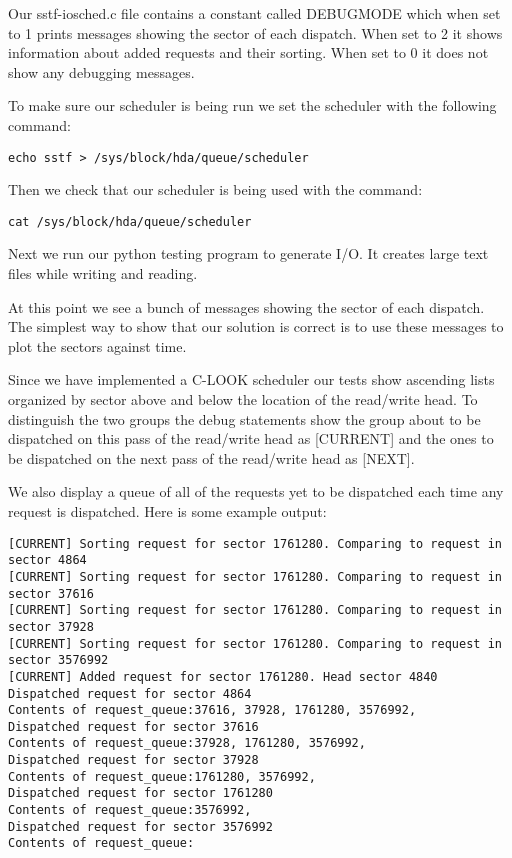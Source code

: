\documentclass[journal,10pt,onecolumn,letterpaper,draftclsnofoot]{IEEEtran}
\begin{document}
Our sstf-iosched.c file contains a constant called DEBUG\textunderscore MODE which when set to 1 prints messages showing the sector of each dispatch. When set to 2 it shows information about added requests and their sorting. When set to 0 it does not show any debugging messages.

To make sure our scheduler is being run we set the scheduler with 
the following command:
\begin{verbatim}
echo sstf > /sys/block/hda/queue/scheduler
\end{verbatim}

Then we check that our scheduler is being used with the command:
\begin{verbatim}
cat /sys/block/hda/queue/scheduler
\end{verbatim}

Next we run our python testing program to generate I/O. It creates large text files while writing and reading.

At this point we see a bunch of messages showing the sector of each dispatch. The simplest way to show that our solution is correct is to use these messages to plot the sectors against time.

Since we have implemented a C-LOOK scheduler our tests show ascending lists organized by sector above and below the location of the read/write head. To distinguish the two groups the debug statements show the group about to be dispatched on this pass of the read/write head as [CURRENT] and the ones to be dispatched on the next pass of the read/write head as [NEXT].

We also display a queue of all of the requests yet to be dispatched each time any request is dispatched. Here is some example output:

\begin{verbatim}
[CURRENT] Sorting request for sector 1761280. Comparing to request in sector 4864
[CURRENT] Sorting request for sector 1761280. Comparing to request in sector 37616
[CURRENT] Sorting request for sector 1761280. Comparing to request in sector 37928
[CURRENT] Sorting request for sector 1761280. Comparing to request in sector 3576992
[CURRENT] Added request for sector 1761280. Head sector 4840
Dispatched request for sector 4864
Contents of request_queue:37616, 37928, 1761280, 3576992,
Dispatched request for sector 37616
Contents of request_queue:37928, 1761280, 3576992,
Dispatched request for sector 37928
Contents of request_queue:1761280, 3576992,
Dispatched request for sector 1761280
Contents of request_queue:3576992,
Dispatched request for sector 3576992
Contents of request_queue:
\end{verbatim}
\end{document}
